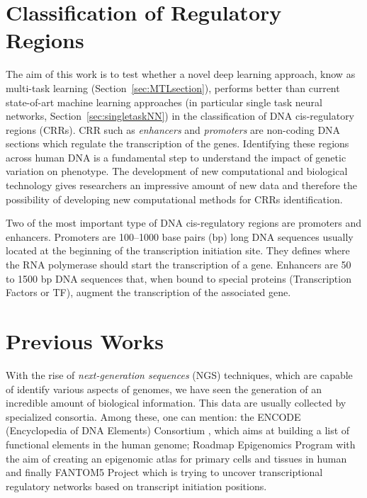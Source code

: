 \section{Classification of Regulatory Regions}
The aim of this work is to test whether a novel deep learning approach,
know as multi-task learning (Section~\ref{sec:MTLsection}), performs better than current state-of-art
machine learning approaches (in particular single task neural networks, Section~\ref{sec:singletaskNN}) in the classification of DNA cis-regulatory regions (CRRs). CRR such as
\emph{enhancers} and \emph{promoters} are non-coding DNA sections which
regulate the transcription of the genes. Identifying these regions across
human DNA is a fundamental step to understand the impact of genetic
variation on phenotype. The development of new computational and
biological technology gives researchers an impressive amount of new data and therefore the possibility of developing new computational methods
for CRRs identification.

Two of the most important type of DNA cis-regulatory regions are promoters
and enhancers. Promoters are 100–1000 base pairs (bp) long DNA sequences
usually located at the beginning of the transcription initiation site.
They defines where the RNA polymerase should start the transcription of a
gene. Enhancers are 50 to 1500 bp DNA sequences that, when bound to
special proteins (Transcription Factors or TF), augment the transcription
of the associated gene.

\section{Previous Works}
With the rise of \emph{next-generation sequences} (NGS) techniques, which are
capable of identify various aspects of genomes, we have seen the generation of an incredible amount of biological information. This data are usually
collected by specialized consortia. Among these, one can mention: the ENCODE
(Encyclopedia of DNA Elements) Consortium \cite{ENCODE_data}, which aims at building a list of functional elements in the human genome; Roadmap Epigenomics Program \cite{ROADMAP} with the aim of creating an epigenomic atlas for primary cells and tissues in human and finally FANTOM5 Project \cite{FANTOM_data} which is trying to uncover transcriptional regulatory networks based on transcript initiation positions.

